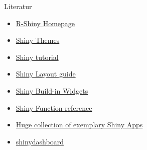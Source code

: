 \documentclass[xcolor=dvipsnames]{beamer}\usepackage[]{graphicx}\usepackage[]{color}
\begin{document}
\begin{frame}{Literatur}
  \begin{itemize}
    \item \href{https://shiny.rstudio.com/}{R-Shiny Homepage}
    \item \href{https://rstudio.github.io/shinythemes/}{Shiny Themes}
    \item \href{https://rstudio.github.io/shiny/tutorial}{Shiny tutorial}
    \item \href{https://shiny.rstudio.com/articles/layout-guide.html}{Shiny Layout guide}
    \item \href{https://shiny.rstudio.com/gallery/widget-gallery.html}{Shiny Build-in Widgets}
    \item \href{https://shiny.rstudio.com/reference/shiny/}{Shiny Function reference}
    \item \href{https://shiny.rstudio.com/gallery/}{Huge collection of exemplary Shiny Apps}
    \item \href{http://rstudio.github.io/shinydashboard/get_started.html}{shinydashboard}
  \end{itemize}
\end{frame}  
  

\begin{frame}

  
\end{frame} 
\end{document}
